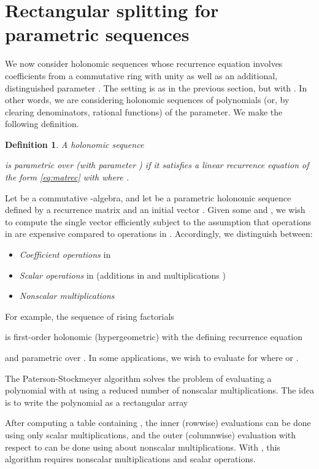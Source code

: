 \documentclass{sig-alternate}
\newtheorem{definition}[theorem]{Definition}
\begin{document}
\section{Rectangular splitting for \\ parametric sequences} \label{sect:rectangular}

We now consider holonomic sequences whose recurrence equation
involves coefficients from a commutative ring  with unity
as well as an additional, distinguished parameter .
The setting is as in the previous section, but with
. In other words, we are considering
holonomic sequences of polynomials (or, by clearing denominators, rational functions)
of the parameter. We make the following definition.

\begin{definition}
A holonomic sequence

is parametric over  (with parameter )
if it satisfies a linear recurrence equation of
the form \eqref{eq:matrec} with  where .
\end{definition}

Let  be a commutative -algebra, and let  be a
parametric holonomic sequence defined by a recurrence matrix
 and an initial vector
.
Given some  and , we wish to compute
the single vector  efficiently subject to
the assumption that operations in  are expensive
compared to operations in . Accordingly, we distinguish between:
\begin{itemize}
\item \emph{Coefficient operations} in 
\item \emph{Scalar operations} in  (additions in  and multiplications )
\item \emph{Nonscalar multiplications} 
\end{itemize}

For example, the sequence of rising factorials

is first-order holonomic (hypergeometric) with
the defining recurrence equation

and parametric over . In some applications,
we wish to evaluate  for  where
 or .

The Paterson-Stockmeyer algorithm \cite{PatersonStockmeyer1973}
solves the problem of evaluating a polynomial
 with 
at  using a reduced
number of nonscalar multiplications. The idea is to write
the polynomial as a rectangular array

After computing a table containing , the
inner (rowwise) evaluations can be done using only scalar multiplications,
and the outer (columnwise) evaluation with respect to 
can be done using about  nonscalar multiplications.
With , this algorithm requires  nonscalar
multiplications and  scalar operations.
\end{document}
